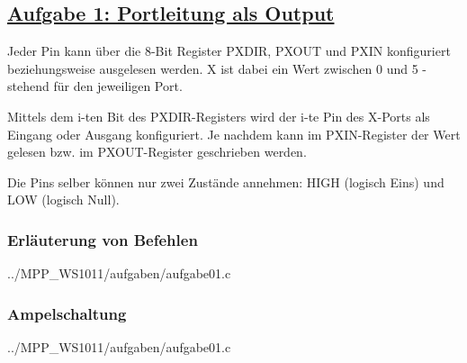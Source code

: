 \subsection*
{\href{http://cst.mi.fu-berlin.de/intern/19606-P-MPP/Aufgaben/040101.html}
{Aufgabe 1: Portleitung als Output}}

Jeder Pin kann über die 8-Bit Register PXDIR, PXOUT und PXIN konfiguriert beziehungsweise ausgelesen werden.
X ist dabei ein Wert zwischen 0 und 5 - stehend für den jeweiligen Port.

Mittels dem i-ten Bit des PXDIR-Registers wird der i-te Pin des X-Ports als Eingang oder Ausgang konfiguriert.
Je nachdem kann im PXIN-Register der Wert gelesen bzw. im PXOUT-Register geschrieben werden.

Die Pins selber können nur zwei Zustände annehmen: HIGH (logisch Eins) und LOW (logisch Null).
\subsubsection*{Erläuterung von Befehlen}

{../MPP_WS1011/aufgaben/aufgabe01.c}

\subsubsection*{Ampelschaltung}


{../MPP_WS1011/aufgaben/aufgabe01.c}
